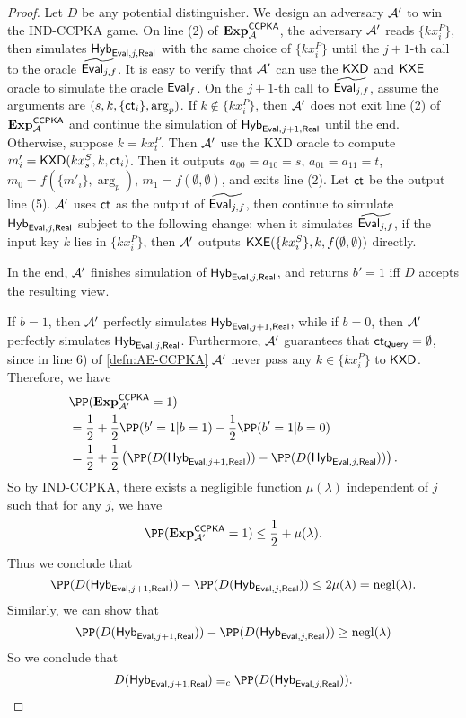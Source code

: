 \begin{proof}
    Let $D$ be any potential distinguisher. We design an adversary $\mathcal{A}'$ to win the IND-CCPKA game. On line (2) of $\mathbf{Exp}^{\mathsf{CCPKA}}_{\mathcal{A}}$, the adversary $\mathcal{A}'$ reads $\{kx_i^P\}$, then simulates $\mathsf{Hyb}_{\mathsf{Eval}, j, \mathsf{Real}}$ with the same choice of $\{kx_i^P\}$ until the $j + 1$-th call to the oracle $\widetilde{\mathsf{Eval}_{j, f}}$. It is easy to verify that $\mathcal{A}'$ can use the $\mathsf{KXD}$ and $\mathsf{KXE}$ oracle to simulate the oracle $\mathsf{Eval}_f$. On the $j + 1$-th call to $\widetilde{\mathsf{Eval}_{j, f}}$, assume the arguments are $(s, k, \{\mathsf{ct}_i\}, \arg_p)$. If $k\notin \{kx_i^P\}$, then $\mathcal{A}'$ does not exit line (2) of $\mathbf{Exp}^{\mathsf{CCPKA}}_{\mathcal{A}}$ and continue the simulation of $\mathsf{Hyb}_{\mathsf{Eval}, j + 1, \mathsf{Real}}$ until the end. Otherwise, suppose $k = kx_{t}^P$. Then $\mathcal{A}'$ use the KXD oracle to compute $m'_i = \mathsf{KXD}(kx_s^S, k, \mathsf{ct}_i)$. Then it outputs $a_{00} = a_{10} = s$, $a_{01} = a_{11} = t$, $m_0 = f(\{m'_i\}, \arg_p)$, $m_1 = f(\emptyset, \emptyset)$, and exits line (2). Let $\mathsf{ct}$ be the output line (5). $\mathcal{A}'$ uses $\mathsf{ct}$ as the output of $\widetilde{\mathsf{Eval}_{j, f}}$, then continue to simulate $\mathsf{Hyb}_{\mathsf{Eval}, j, \mathsf{Real}}$ subject to the following change: when it simulates $\widetilde{\mathsf{Eval}_{j, f}}$, if the input key $k$ lies in $\{kx_i^P\}$, then $\mathcal{A}'$ outputs $\mathsf{KXE}(\{kx_i^S\}, k, f(\emptyset, \emptyset))$ directly.

    In the end, $\mathcal{A}'$ finishes simulation of $\mathsf{Hyb}_{\mathsf{Eval}, j, \mathsf{Real}}$, and returns $b' = 1$ iff $D$ accepts the resulting view.

    If $b = 1$, then $\mathcal{A}'$ perfectly simulates $\mathsf{Hyb}_{\mathsf{Eval}, j + 1, \mathsf{Real}}$, while if $b = 0$, then $\mathcal{A}'$ perfectly simulates $\mathsf{Hyb}_{\mathsf{Eval}, j, \mathsf{Real}}$. Furthermore, $\mathcal{A}'$ guarantees that $\mathsf{ct}_{\mathsf{Query}} = \emptyset$, since in line 6) of \cref{defn:AE-CCPKA} $\mathcal{A}'$ never pass any $k \in \{kx_i^P\}$ to $\mathsf{KXD}$. Therefore, we have
    \begin{align*}
     &\PP(\mathbf{Exp}^{\mathsf{CCPKA}}_{\cA'} = 1) \\
     &= \frac{1}{2} + \frac{1}{2}\PP(b' = 1 | b = 1) - \frac{1}{2}\PP(b' = 1 | b = 0) \\   
     &= \frac{1}{2} + \frac{1}{2}\left(\PP(D(\Hyb_{\Eval, j + 1, \Real})) - \PP(D(\Hyb_{\Eval, j, \Real}))\right).
    \end{align*}
    So by IND-CCPKA, there exists a negligible function $\mu(\lambda)$ independent of $j$ such that for any $j$, we have
    $$\PP(\mathbf{Exp}^{\mathsf{CCPKA}}_{\cA'} = 1) \leq \frac{1}{2} + \mu(\lambda).$$
    Thus we conclude that
    $$\PP(D(\Hyb_{\Eval, j + 1, \Real})) - \PP(D(\Hyb_{\Eval, j, \Real})) \leq 2\mu(\lambda) = \negl(\lambda).$$
    Similarly, we can show that
    $$\PP(D(\Hyb_{\Eval, j + 1, \Real})) - \PP(D(\Hyb_{\Eval, j, \Real})) \geq \negl(\lambda)$$
    So we conclude that
    $$D(\Hyb_{\Eval, j + 1, \Real}) \equiv_c \PP(D(\Hyb_{\Eval, j, \Real})).$$
\end{proof}
